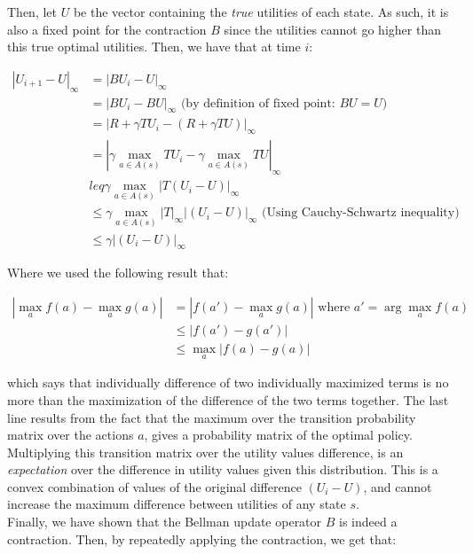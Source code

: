 \documentclass[11pt]{article}
\begin{document}
Then, let $U$ be the vector containing the \textit{true} utilities of each state. As such, it is also a fixed point for the contraction $B$ since the utilities cannot go higher than this true optimal utilities. Then, we have that at time $i$:

$$
\begin{aligned}
\left| U_{i+1} - U \right|_{\infty} & = \left| BU_{i} - U \right|_{\infty}\\
&= \left| BU_i - BU \right|_{\infty} \text{ (by definition of fixed point: $BU = U$)}\\
&= \left| R + \gamma TU_i - (R + \gamma TU) \right|_{\infty}\\
&= \left| \gamma \underset{a \in A(s)}{\max} TU_i  - \gamma \underset{a \in A(s)}{\max} TU \right|_{\infty}\\
&leq \gamma \underset{a \in A(s)}{\max} \left| T(U_i  - U) \right|_{\infty}\\
&\leq \gamma \underset{a \in A(s)}{\max} \left| T \right|_{\infty} \left| (U_i  - U) \right|_{\infty} \text{ (Using Cauchy-Schwartz inequality)}\\
&\leq \gamma \left| (U_i  - U) \right|_{\infty}
\end{aligned}
$$

Where we used the following result that:

$$
\begin{aligned}
\left| \max_a f(a) - \max_a g(a) \right| &= \left| f(a') - \max_a g(a) \right| \text{ where } a' = \arg\max_a f(a) \\
&\leq \left| f(a') - g(a') \right|\\
&\leq \max_a |f(a) - g(a)|
\end{aligned}
$$

which says that individually difference of two individually maximized terms is no more than the maximization of the difference of the two terms together. The last line results from the fact that the maximum over the transition probability matrix over the actions $a$, gives a probability matrix of the optimal policy. Multiplying this transition matrix over the utility values difference, is an \textit{expectation} over the difference in utility values given this distribution. This is a convex combination of values of the original difference $(U_i  - U)$, and cannot increase the maximum difference between utilities of any state $s$.\\

Finally, we have shown that the Bellman update operator $B$ is indeed a contraction. Then, by repeatedly applying the contraction, we get that:
\end{document}

